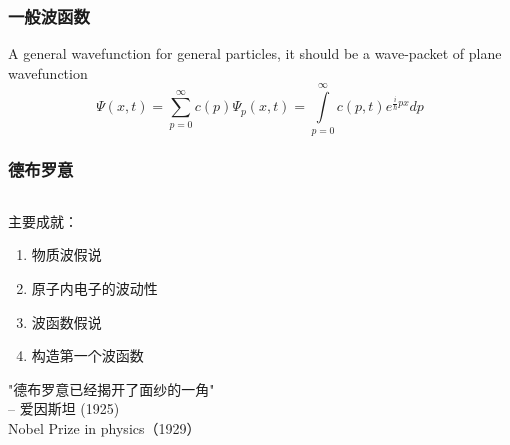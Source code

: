 \begin{frame}
    \frametitle{一般波函数}
         A general wavefunction for general particles, it should be a wave-packet of plane wavefunction
         \begin{equation*}
                \Psi(x,t)=\sum\limits_{p=0} ^{\infty} c(p)\Psi_p(x,t) = \int\limits_{p=0} ^{\infty} c(p,t) e^{\frac{i}{\hbar}px}dp
         \end{equation*}
\end{frame}


\begin{frame}
    \frametitle{德布罗意}
        \begin{columns}
            \begin{column}[t]{0.46\linewidth}
                主要成就：
                \begin{enumerate}
                    \item 物质波假说
                    \item 原子内电子的波动性
                    \item 波函数假说 
                    \item 构造第一个波函数
                \end{enumerate}
                "德布罗意已经揭开了面纱的一角"  \\
                \qquad \qquad-- 爱因斯坦 (1925) \\
                {\color{deepred} Nobel Prize in physics（1929）}
            \end{column}
            \begin{column}[t]{0.46\linewidth}
                \begin{center}

\end{center}
\end{column}
\end{columns}
\end{frame}
